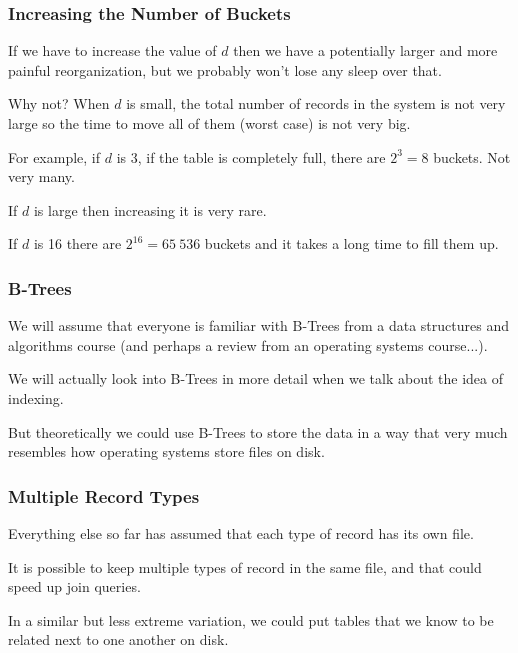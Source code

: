 \begin{frame}
\frametitle{Increasing the Number of Buckets}
If we have to increase the value of $d$ then we have a potentially larger and more painful reorganization, but we probably won't lose any sleep over that. 

Why not? When $d$ is small, the total number of records in the system is not very large so the time to move all of them (worst case) is not very big. 

For example, if $d$ is 3, if the table is completely full, there are $2^{3} = 8$ buckets. Not very many. 

If $d$ is large then increasing it is very rare. 

If $d$ is 16 there are $2^{16} = 65~536$ buckets and it takes a long time to fill them up.

\end{frame}




\begin{frame}
\frametitle{B-Trees}

We will assume that everyone is familiar with B-Trees from a data structures and algorithms course (and perhaps a review from an operating systems course...). 

We will actually look into B-Trees in more detail when we talk about the idea of indexing. 

But theoretically we could use B-Trees to store the data in a way that very much resembles how operating systems store files on disk.

\end{frame}



\begin{frame}
\frametitle{Multiple Record Types}

Everything else so far has assumed that each type of record has its own file.

It is possible to keep multiple types of record in the same file, and that could speed up join queries.

In a similar but less extreme variation, we could put tables that we know to be related next to one another on disk.

\end{frame}







